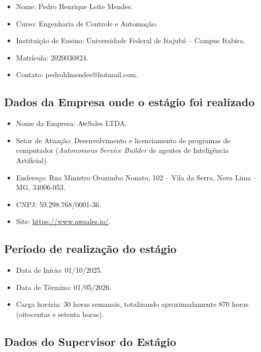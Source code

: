 \documentclass[12pt,a4paper,oneside]{article}
\begin{document}
\begin{itemize}[leftmargin=2em,topsep=0pt]
  \item Nome: Pedro Henrique Leite Mendes.
  \item Curso: Engenharia de Controle e Automação.
  \item Instituição de Ensino: Universidade Federal de Itajubá -- Campus Itabira.
  \item Matrícula: 2020030824.
  \item Contato: pedrohlmendes@hotmail.com.
\end{itemize}

\subsection{Dados da Empresa onde o estágio foi realizado}

\begin{itemize}[leftmargin=2em,topsep=0pt]
  \item Nome da Empresa: AwSales LTDA.
  \item Setor de Atuação: Desenvolvimento e licenciamento de programas de computador (\textit{Autonomous Service Builder} de agentes de Inteligência Artificial).
  \item Endereço: Rua Ministro Orozimbo Nonato, 102 -- Vila da Serra, Nova Lima -- MG, 34006-053.
  \item CNPJ: 59.298.768/0001-36.
  \item Site: \url{https://www.awsales.io/}.
\end{itemize}

\subsection{Período de realização do estágio}

\begin{itemize}[leftmargin=2em,topsep=0pt]
  \item Data de Início: 01/10/2025.
  \item Data de Término: 01/05/2026.
  \item Carga horária: 30 horas semanais, totalizando aproximadamente 870 horas (oitocentas e setenta horas).
\end{itemize}

\subsection{Dados do Supervisor do Estágio}
\end{document}
